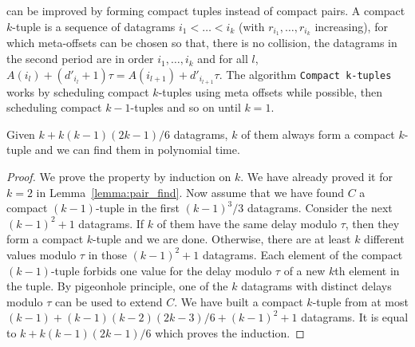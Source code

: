 \compactpair can be improved by forming compact tuples instead of compact pairs.
A compact $k$-tuple is a sequence of datagrams $i_1 < \dots < i_k$ (with $r_{i_1},\dots,r_{i_k}$ increasing), for which meta-offsets can be chosen so that, there is no collision, the datagrams in the second period are in order $i_1,\dots,i_k$ and for all $l$, $A(i_l) + (d'_{i_l} + 1)\tau = A(i_{l+1}) + d'_{i_{l+1}}\tau$.
The algorithm \texttt{Compact k-tuples} works by scheduling compact $k$-tuples
using meta offsets while possible, then scheduling compact $k-1$-tuples and so on until $k=1$.


\begin{lemma}\label{lemma:uple_find}
Given $k + k(k-1)(2k-1)/6$ datagrams, $k$ of them always form a compact $k$-tuple and we can find them in polynomial time. 
\end{lemma}
\begin{proof}
We prove the property by induction on $k$. We have already proved it for $k=2$ in Lemma~\ref{lemma:pair_find}.
Now assume that we have found $C$ a compact $(k-1)$-tuple in the first $(k-1)^3/3$
datagrams. Consider the next $(k-1)^2 + 1$ datagrams. If $k$ of them have the same delay modulo $\tau$,
then they form a compact $k$-tuple and we are done. Otherwise, there are at least $k$ different values modulo $\tau$
in those $(k-1)^2 + 1$ datagrams. Each element of the compact $(k-1)$-tuple forbids one value for the delay modulo $\tau$ of a new $k$th element in the tuple. By pigeonhole principle, one of the $k$ datagrams with distinct delays modulo $\tau$ can be used to extend $C$. We have built a compact $k$-tuple from at most $(k-1) + (k-1)(k-2)(2k-3)/6 + (k-1)^2 + 1$ datagrams.
It is equal to $k + k(k-1)(2k-1)/6$ which proves the induction.
\end{proof}


